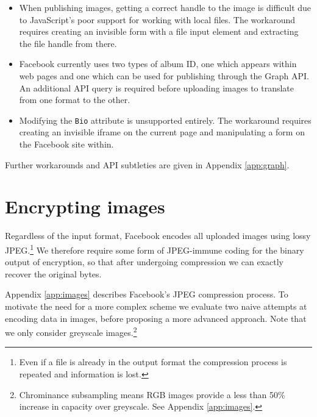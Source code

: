 \begin{itemize}

    \item When publishing images, getting a correct handle to the image is difficult due to JavaScript's poor support for working with local files. The workaround requires creating an invisible form with a file input element and extracting the file handle from there.

    \item Facebook currently uses two types of album ID, one which appears within web pages and one which can be used for publishing through the Graph API. An additional API query is required before uploading images to translate from one format to the other.
    
    \item Modifying the {\tt Bio} attribute is unsupported entirely. The workaround requires creating an invisible iframe on the current page and manipulating a form on the Facebook site within.

\end{itemize}

Further workarounds and API subtleties are given in Appendix \ref{app:graph}.



    
\FloatBarrier
\section{Encrypting images}
\label{ssec:images}


Regardless of the input format, Facebook encodes all uploaded images using lossy JPEG.\footnote{Even if a file is already in the output format the compression process is repeated and information is lost.} We therefore require some form of JPEG-immune coding for the binary output of encryption, so that after undergoing compression we can exactly recover the original bytes.

Appendix \ref{app:images} describes Facebook's JPEG compression process. To motivate the need for a more complex scheme we evaluate two naive attempts at encoding data in images, before proposing a more advanced approach. Note that we only consider greyscale images.\footnote{Chrominance subsampling means RGB images provide a less than 50\% increase in capacity over greyscale. See Appendix \ref{app:images}.}


